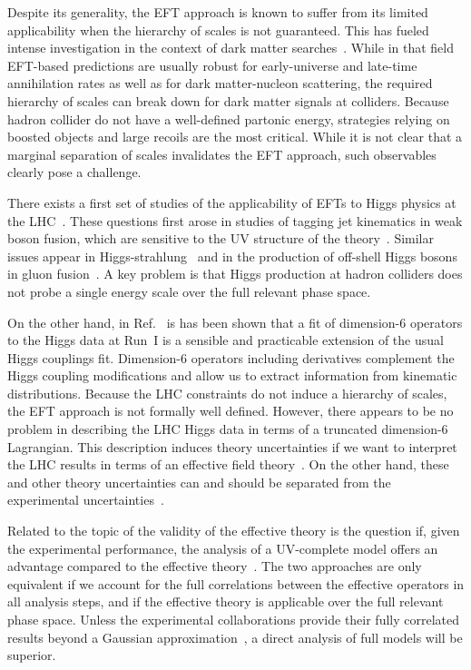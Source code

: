 Despite its generality, the EFT approach is known to suffer from its
limited applicability when the hierarchy of scales is not guaranteed.
This has fueled intense investigation in the context of dark matter
searches~\cite{dm}.  While in that field EFT-based predictions are
usually robust for early-universe and late-time annihilation rates as
well as for dark matter-nucleon scattering, the required hierarchy of
scales can break down for dark matter signals at colliders. Because
hadron collider do not have a well-defined partonic energy, strategies
relying on boosted objects and large recoils are the most
critical. While it is not clear that a marginal separation of scales
invalidates the EFT approach, such observables clearly pose a
challenge.\medskip

There exists a first set of studies of the applicability of EFTs to
Higgs physics at the
LHC~\cite{Biekoetter:2014jwa,heft_limitations,heft_limitations2}.
These questions first arose in studies of tagging jet kinematics in
weak boson fusion, which are sensitive to the UV structure of the
theory~\cite{bad_one,spins,phi_jj,higgs_pole}. Similar issues appear
in Higgs-strahlung~\cite{Biekoetter:2014jwa} and in the production of
off-shell Higgs bosons in gluon
fusion~\cite{taming,Buschmann:2014sia}. A key problem is that Higgs
production at hadron colliders does not probe a single energy scale
over the full relevant phase space.

On the other hand, in Ref.~\cite{Corbett:2015ksa} is has been shown that
a fit of dimension-6 operators to the Higgs data at Run~I is a
sensible and practicable extension of the usual Higgs couplings fit.
Dimension-6 operators including derivatives complement the Higgs
coupling modifications and allow us to extract information from
kinematic distributions. Because the LHC constraints do not induce a
hierarchy of scales, the EFT approach is not formally well
defined. However, there appears to be no problem in describing the LHC
Higgs data in terms of a truncated dimension-6 Lagrangian. This
description induces theory uncertainties if we want to interpret the
LHC results in terms of an effective field theory~\cite{trott}. On the
other hand, these and other theory uncertainties can and should be
separated from the experimental
uncertainties~\cite{Cranmer:2013hia,fichet_moreau}.

Related to the topic of the validity of the effective theory is the
question if, given the experimental performance, the analysis of a
UV-complete model offers an advantage compared to the effective
theory~\cite{Henning:2014wua}. The two approaches are only equivalent
if we account for the full correlations between the effective
operators in all analysis steps, and if the effective theory is
applicable over the full relevant phase space. Unless the experimental
collaborations provide their fully correlated results beyond a
Gaussian approximation~\cite{Corbett:2015ksa}, a direct analysis of full
models will be superior.\medskip

